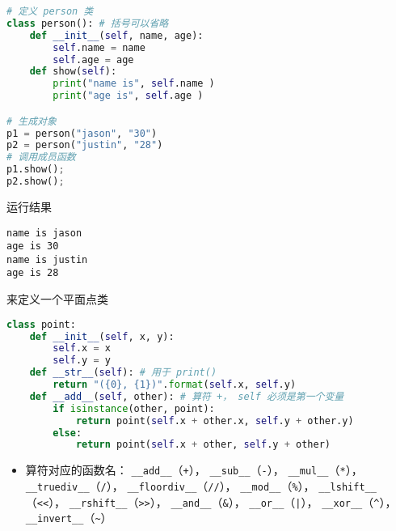 
\begin{issues}
\issueDraft
\end{issues}


\begin{lstlisting}[language=python]
# 定义 person 类
class person(): # 括号可以省略
    def __init__(self, name, age): 
        self.name = name 
        self.age = age 
    def show(self): 
        print("name is", self.name ) 
        print("age is", self.age ) 

# 生成对象
p1 = person("jason", "30") 
p2 = person("justin", "28")
# 调用成员函数
p1.show();
p2.show();
\end{lstlisting}
运行结果
\begin{lstlisting}
name is jason
age is 30
name is justin
age is 28
\end{lstlisting}

来定义一个平面点类
\begin{lstlisting}[language=python]
class point:
    def __init__(self, x, y): 
        self.x = x 
        self.y = y 
    def __str__(self): # 用于 print()
        return "({0}, {1})".format(self.x, self.y)
    def __add__(self, other): # 算符 +， self 必须是第一个变量
        if isinstance(other, point):
            return point(self.x + other.x, self.y + other.y)
        else:
            return point(self.x + other, self.y + other)
\end{lstlisting}
\begin{itemize}
\item 算符对应的函数名： \verb|__add__|（\verb|+|）， \verb|__sub__|（\verb|-|）， \verb|__mul__|（\verb|*|）， \verb|__truediv__|（\verb|/|）， \verb|__floordiv__|（\verb|//|）， \verb|__mod__|（\verb|%|）， \verb|__lshift__|（\verb|<<|）， \verb|__rshift__|（\verb|>>|）， \verb|__and__|（\verb|&|）， \verb|__or__|（\verb`|`）， \verb|__xor__|（\verb|^|）， \verb|__invert__|（\verb|~|）
\end{itemize}


